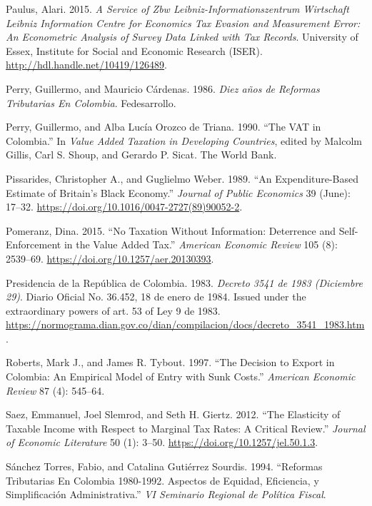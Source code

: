 \documentclass[
  12pt,
  letterpaper,
  oneside,
  openany]{report}
\newlength{\cslhangindent}
\newenvironment{CSLReferences}[2] %
 {\begin{list}{}{%
  \setlength{\itemindent}{0pt}
  \setlength{\leftmargin}{0pt}
  \setlength{\parsep}{0pt}
  \ifodd #1
   \setlength{\leftmargin}{\cslhangindent}
   \setlength{\itemindent}{-1\cslhangindent}
  \fi
  \setlength{\itemsep}{#2\baselineskip}}}
 {\end{list}}
\begin{document}
\begin{CSLReferences}{1}{1}
Paulus, Alari. 2015. \emph{A Service of Zbw Leibniz-Informationszentrum
Wirtschaft Leibniz Information Centre for Economics Tax Evasion and
Measurement Error: An Econometric Analysis of Survey Data Linked with
Tax Records}. {University of Essex, Institute for Social and Economic
Research (ISER)}. \url{http://hdl.handle.net/10419/126489}.

Perry, Guillermo, and Mauricio Cárdenas. 1986. \emph{Diez a{ñ}os de
Reformas Tributarias En {Colombia}}. Fedesarrollo.

Perry, Guillermo, and Alba Lucía Orozco de Triana. 1990. {``The VAT in
Colombia.''} In \emph{Value Added Taxation in Developing Countries},
edited by Malcolm Gillis, Carl S. Shoup, and Gerardo P. Sicat. The World
Bank.

Pissarides, Christopher A., and Guglielmo Weber. 1989. {``An
Expenditure-Based Estimate of Britain's Black Economy.''} \emph{Journal
of Public Economics} 39 (June): 17--32.
\url{https://doi.org/10.1016/0047-2727(89)90052-2}.

Pomeranz, Dina. 2015. {``No Taxation Without Information: Deterrence and
Self-Enforcement in the Value Added Tax.''} \emph{American Economic
Review} 105 (8): 2539--69. \url{https://doi.org/10.1257/aer.20130393}.

Presidencia de la República de Colombia. 1983. \emph{Decreto 3541 de
1983 (Diciembre 29)}. Diario Oficial No. 36.452, 18 de enero de 1984.
Issued under the extraordinary powers of art. 53 of Ley 9 de 1983.
\url{https://normograma.dian.gov.co/dian/compilacion/docs/decreto_3541_1983.htm}.

Roberts, Mark J., and James R. Tybout. 1997. {``The Decision to Export
in {Colombia}: An Empirical Model of Entry with Sunk Costs.''}
\emph{American Economic Review} 87 (4): 545--64.

Saez, Emmanuel, Joel Slemrod, and Seth H. Giertz. 2012. {``The
Elasticity of Taxable Income with Respect to Marginal Tax Rates: A
Critical Review.''} \emph{Journal of Economic Literature} 50 (1): 3--50.
\url{https://doi.org/10.1257/jel.50.1.3}.

Sánchez Torres, Fabio, and Catalina Gutiérrez Sourdis. 1994. {``Reformas
Tributarias En Colombia 1980-1992. Aspectos de Equidad, Eficiencia, y
Simplificación Administrativa.''} \emph{VI Seminario Regional de
Política Fiscal}.


\end{CSLReferences}
\end{document}
